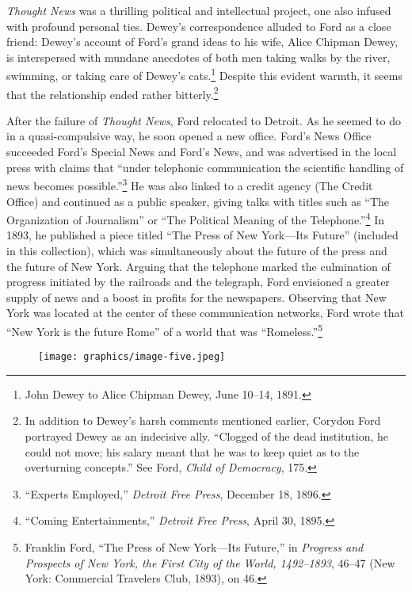 \documentclass[openany,nobib]{tufte-book}
\begin{document}
\emph{Thought News} was a thrilling political and intellectual project,
one also infused with profound personal ties. Dewey's correspondence
alluded to Ford as a close friend: Dewey's account of Ford's grand ideas
to his wife, Alice Chipman Dewey, is interspersed with mundane anecdotes
of both men taking walks by the river, swimming, or taking care of
Dewey's cats.\footnote{John Dewey to Alice Chipman Dewey, June 10--14,
  1891.} Despite this evident warmth, it seems that the relationship
ended rather bitterly.\footnote{In addition to Dewey's harsh comments
  mentioned earlier, Corydon Ford portrayed Dewey as an indecisive ally.
  ``Clogged of the dead institution, he could not move; his salary meant
  that he was to keep quiet as to the overturning concepts.'' See Ford,
  \emph{Child of Democracy}, 175.}

After the failure of \emph{Thought News}, Ford relocated to Detroit. As
he seemed to do in a quasi-compulsive way, he soon opened a new office.
Ford's News Office succeeded Ford's Special News and Ford's News, and
was advertised in the local press with claims that ``under telephonic
communication the scientific handling of news becomes
possible.''\footnote{``Experts Employed,'' \emph{Detroit Free Press},
  December 18, 1896.} He was also linked to a credit agency (The Credit
Office) and continued as a public speaker, giving talks with titles such
as ``The Organization of Journalism'' or ``The Political Meaning of the
Telephone.''\footnote{``Coming Entertainments,'' \emph{Detroit Free
  Press}, April 30, 1895.} In 1893, he published a piece titled ``The
Press of New York---Its Future'' (included in this collection), which
was simultaneously about the future of the press and the future of New
York. Arguing that the telephone marked the culmination of progress
initiated by the railroads and the telegraph, Ford envisioned a greater
supply of news and a boost in profits for the newspapers. Observing that
New York was located at the center of these communication networks, Ford
wrote that ``New York is the future Rome'' of a world that was
``Romeless.''\footnote{Franklin Ford, ``The Press of New York---Its
  Future,'' in \emph{Progress and Prospects of New York, the First City
  of the World, 1492--1893}, 46--47 (New York: Commercial Travelers
  Club, 1893), on 46.}

\begin{figure}
   \texttt{[image: graphics/image-five.jpeg]}
   \label{fig:fig5}
\end{figure}
\end{document}
